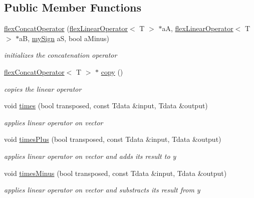 \subsection*{Public Member Functions}
\begin{DoxyCompactItemize}
\item 
\hyperlink{classflex_concat_operator_aa0b80af6e02e39f68c5d2a07f5e7503d}{flex\+Concat\+Operator} (\hyperlink{classflex_linear_operator}{flex\+Linear\+Operator}$<$ T $>$ $\ast$aA, \hyperlink{classflex_linear_operator}{flex\+Linear\+Operator}$<$ T $>$ $\ast$aB, \hyperlink{tools_8h_ab8be8fa992a31c15058261e81ef8ba9d}{my\+Sign} aS, bool a\+Minus)
\begin{DoxyCompactList}\small\item\em initializes the concatenation operator \end{DoxyCompactList}\item 
\hyperlink{classflex_concat_operator}{flex\+Concat\+Operator}$<$ T $>$ $\ast$ \hyperlink{classflex_concat_operator_a8e554cb6edb47de0cf922cf51ec398b5}{copy} ()
\begin{DoxyCompactList}\small\item\em copies the linear operator \end{DoxyCompactList}\item 
void \hyperlink{classflex_concat_operator_af32c0fc8fc008a965d825dd0607ea388}{times} (bool transposed, const Tdata \&input, Tdata \&output)
\begin{DoxyCompactList}\small\item\em applies linear operator on vector \end{DoxyCompactList}\item 
void \hyperlink{classflex_concat_operator_a37962bd56dfb7853541e482f30a6ab23}{times\+Plus} (bool transposed, const Tdata \&input, Tdata \&output)
\begin{DoxyCompactList}\small\item\em applies linear operator on vector and adds its result to y \end{DoxyCompactList}\item 
void \hyperlink{classflex_concat_operator_a270c30ae4a8420729348eba8051ee322}{times\+Minus} (bool transposed, const Tdata \&input, Tdata \&output)
\begin{DoxyCompactList}\small\item\em applies linear operator on vector and substracts its result from y \end{DoxyCompactList}\item 

\end{DoxyCompactItemize}

